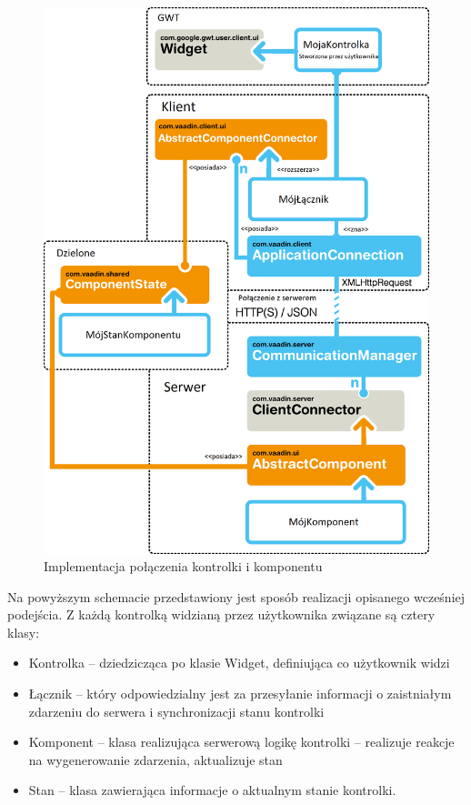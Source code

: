 \begin{figure} [H]
    \begin{center}
	\includegraphics[scale=.2]{img/architektura.png}
	\caption{Implementacja połączenia kontrolki i komponentu}
	\label{clientVaadin}
    \end{center}
\end{figure}

Na powyższym schemacie przedstawiony jest sposób realizacji opisanego wcześniej podejścia. Z każdą kontrolką widzianą przez użytkownika związane są cztery klasy:
\begin{itemize}
\item Kontrolka – dziedzicząca po klasie Widget, definiująca co użytkownik widzi
\item Łącznik – który odpowiedzialny jest za przesyłanie informacji o zaistniałym zdarzeniu do serwera i synchronizacji stanu kontrolki
\item Komponent – klasa realizująca serwerową logikę kontrolki – realizuje reakcje na wygenerowanie zdarzenia, aktualizuje stan
\item Stan – klasa zawierająca informacje o aktualnym stanie kontrolki. 
\end{itemize}

